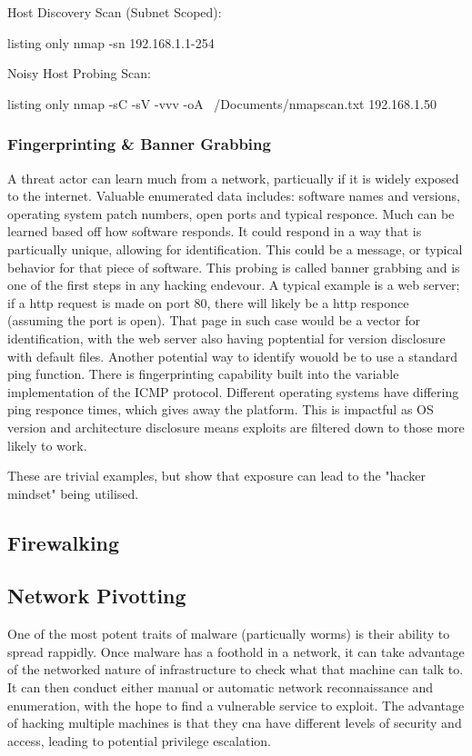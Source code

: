 Host Discovery Scan (Subnet Scoped):
\begin{tcblisting}{listing only}
    nmap -sn 192.168.1.1-254
\end{tcblisting}

Noisy Host Probing Scan:
\begin{tcblisting}{listing only}
nmap -sC -sV -vvv -oA  ~/Documents/nmapscan.txt 192.168.1.50
\end{tcblisting}


\subsubsection{Fingerprinting \& Banner Grabbing}
A threat actor can learn much from a network, particually if it is widely exposed to the internet. Valuable enumerated data includes: software names and versions, operating system patch numbers, open ports and typical responce.
Much can be learned based off how software responds. It could respond in a way that is particually unique, allowing for identification. This could be a message, or typical behavior for that piece of software.
This probing is called banner grabbing and is one of the first steps in any hacking endevour. A typical example is a web server; if a http request is made on port 80, there will likely be a http responce (assuming the port is open).
That page in such case would be a vector for identification, with the web server also having poptential for version disclosure with default files. Another potential way to identify wouold be to use a standard ping function. 
There is fingerprinting capability built into the variable implementation of the ICMP protocol. Different operating systems have differing ping responce times, which gives away the platform. 
This is impactful as OS version and architecture disclosure means exploits are filtered down to those more likely to work.

These are trivial examples, but show that exposure can lead to the "hacker mindset" being utilised.


\subsection{Firewalking}

\subsection{Network Pivotting}
One of the most potent traits of malware (particually worms) is their ability to spread rappidly. Once malware has a foothold in a network, it can take advantage of the networked nature of infrastructure to check what that machine can talk to.
It can then conduct either manual or automatic network reconnaissance and enumeration, with the hope to find a vulnerable service to exploit. The advantage of hacking multiple machines is that they cna have different levels of security and access, 
leading to potential privilege escalation. 

